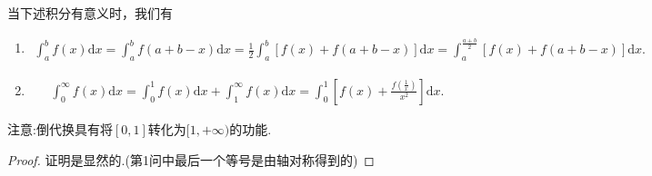 \documentclass[../../main.tex]{subfiles}%
\begin{document}
\begin{theorem}[区间再现恒等式]\label{theorem:区间再现恒等式}
当下述积分有意义时，我们有
\begin{enumerate}
\item \begin{align*}
\int_{a}^{b} f(x)\mathrm{d}x = \int_{a}^{b} f(a + b - x)\mathrm{d}x
=\frac{1}{2}\int_{a}^{b} [f(x)+f(a + b - x)]\mathrm{d}x
=\int_{a}^{\frac{a + b}{2}} [f(x)+f(a + b - x)]\mathrm{d}x.
\end{align*}

\item \begin{align*}
\int_{0}^{\infty} f(x)\mathrm{d}x = \int_{0}^{1} f(x)\mathrm{d}x+\int_{1}^{\infty} f(x)\mathrm{d}x
=\int_{0}^{1} \left[f(x)+\frac{f(\frac{1}{x})}{x^2}\right]\mathrm{d}x.
\end{align*}
\end{enumerate}
\end{theorem}
\begin{note}
注意:倒代换具有将$[0,1]$转化为$[1,+\infty)$的功能.
\end{note}
\begin{proof}
证明是显然的.(第1问中最后一个等号是由轴对称得到的)
\end{proof}
\end{document}
